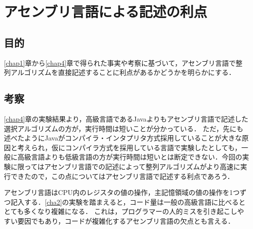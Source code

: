 \chapter{アセンブリ言語による記述の利点}
\section{目的}
\ref{chap1}章から\ref{chap4}章で得られた事実や考察に基づいて，アセンブリ言語で整列アルゴリズムを直接記述することに利点があるかどうかを明らかにする．
\section{考察}
\ref{chap4}章の実験結果より，高級言語である{\ttfamily Java}よりもアセンブリ言語で記述した選択アルゴリズムの方が，実行時間は短いことが分かっている．
ただ，先にも述べたように{\ttfamily Java}がコンパイラ・インタプリタ方式採用していることが大きな原因と考えられ，仮にコンパイラ方式を採用している言語で実験したとしても，一般に高級言語よりも低級言語の方が実行時間は短いとは断定できない．今回の実験に限ってはアセンブリ言語での記述によって整列アルゴリズムがより高速に実行できたので，この点についてはアセンブリ言語で記述する利点であろう．\par
アセンブリ言語はCPU内のレジスタの値の操作，主記憶領域の値の操作を1つずつ記入する．\ref{cha2}の実験を踏まえると，コード量は一般の高級言語に比べるととても多くなり複雑になる．
これは，プログラマーの人的ミスを引き起こしやすい要因でもあり，コードが複雑化するアセンブリ言語の欠点とも言える．